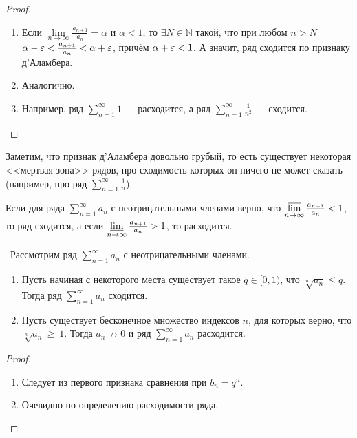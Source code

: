 \documentclass[a4paper, 12pt]{article}
\begin{document}
\begin{proof}
	\ 
	\begin{enumerate}
		\item 	Если $\lim\limits_{n\rightarrow\infty} \frac{a_{n+1}}{a_n} = \alpha$ и $\alpha < 1$, то $\exists N \in \mathbb{N}$ такой, что при любом $n > N$ $\alpha-\varepsilon<\frac{a_{n+1}}{a_n} < \alpha+\varepsilon$, причём $\alpha+\varepsilon <1$. А значит, ряд сходится по признаку д'Аламбера.
		\item Аналогично.
		\item Например, ряд $\sum\limits_{n=1}^{\infty} 1$ --- расходится, а ряд $\sum\limits_{n=1}^{\infty} \frac{1}{n^2}$ --- сходится. 

	\end{enumerate}
\end{proof}
Заметим, что признак д'Аламбера довольно грубый, то есть существует некоторая <<мертвая зона>> рядов, про сходимость которых он ничего не может сказать (например, про ряд  $\sum\limits_{n=1}^{\infty} \frac{1}{n}$).

\begin{Consequence}
	Если для ряда $\sum\limits_{n=1}^{\infty} a_n$ с неотрицательными членами верно, что $\varlimsup\limits_{n\rightarrow \infty} \frac{a_{n+1}}{a_{n}} < 1$, то ряд сходится, а если $\varliminf\limits_{n \rightarrow \infty} \frac{a_{n+1}}{a_{n}} > 1$, то расходится.
\end{Consequence}

\begin{Test}\ 
Рассмотрим ряд $\sum\limits_{n=1}^{\infty} a_n$ с неотрицательными членами.
	\begin{enumerate}
		\item 	Пусть начиная с некоторого места существует такое $q \in [0, 1)$, что $\sqrt[n]{{{a_n}}} \leqslant q$. Тогда ряд $\sum\limits_{n=1}^{\infty} a_n$ сходится.
		\item 	Пусть существует бесконечное множество индексов $n$, для которых верно, что  $\sqrt[n]{{{a_n}}} \geqslant~1$. Тогда $a_n \nrightarrow 0$ и ряд $\sum\limits_{n=1}^{\infty} a_n $ расходится.
	\end{enumerate}
\end{Test}

\begin{proof}
	\ 
	\begin{enumerate}
		\item 	Следует из первого признака сравнения при $b_n = q^n$. 
		\item Очевидно по определению расходимости ряда.
	\end{enumerate}
\end{proof}
\end{document}
